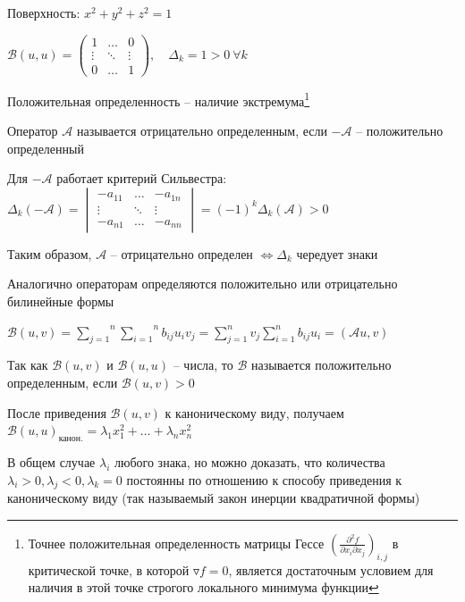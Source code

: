 \documentclass[12pt]{article}
\begin{document}
    \Ex Поверхность: $x^2 + y^2 + z^2 = 1$

    $\mathcal{B}(u, u) = \begin{pmatrix}1 & \dots & 0 \\ \vdots & \ddots & \vdots \\ 0 & \dots & 1\end{pmatrix},
    \quad \Delta_k = 1 > 0 \ \forall k$

    Положительная определенность -- наличие экстремума\footnote{Точнее положительная определенность матрицы Гессе $\left(\frac{\partial^2 f}{\partial x_i \partial x_j}\right)_{i,j}$ в критической точке, в которой $\triangledown f = 0$, является достаточным условием для наличия в этой точке строгого локального минимума функции}

    \Def Оператор $\mathcal{A}$ называется отрицательно определенным, если $-\mathcal{A}$ -- положительно определенный

    \Notas Для $-\mathcal{A}$ работает критерий Сильвестра: $\Delta_k(-\mathcal{A}) =
    \begin{vmatrix}-a_{11} & \dots & -a_{1n} \\ \vdots & \ddots & \vdots \\ -a_{n1} & \dots & -a_{nn}\end{vmatrix} = (-1)^k \Delta_k (\mathcal{A}) > 0$

    Таким образом, $\mathcal{A}$ -- отрицательно определен $\Longleftrightarrow \Delta_k$ чередует знаки

    \Nota Аналогично операторам определяются положительно или отрицательно билинейные формы

    $\mathcal{B}(u, v) = \overset{n}{\underset{j = 1}{\sum}}\overset{n}{\underset{i = 1}{\sum}} b_{ij} u_i v_j = \sum_{j = 1}^n v_j \sum_{i = 1}^n b_{ij} u_i = (\mathcal{A} u, v)$

    Так как $\mathcal{B}(u, v)$ и  $\mathcal{B}(u, u)$ -- числа, то $\mathcal{B}$ называется положительно определенным, если $\mathcal{B}(u, v) > 0$

    \Nota После приведения $\mathcal{B}(u, v)$ к каноническому виду, получаем $\mathcal{B}(u, u)_{\text{канон.}} = \lambda_1 x_1^2 + \dots + \lambda_n x_n^2$

    В общем случае $\lambda_i$ любого знака, но можно доказать, что количества $\lambda_i > 0, \lambda_j < 0, \lambda_k = 0$ постоянны по отношению к способу приведения
    к каноническому виду (так называемый закон инерции квадратичной формы)
\end{document}
